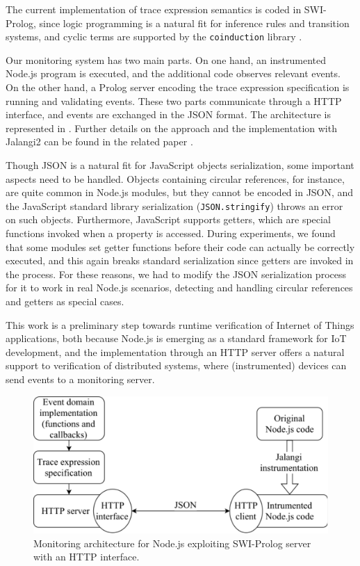 The current implementation of trace expression semantics is coded in SWI-Prolog, since logic programming is a natural fit for inference rules and transition systems, and cyclic terms are supported by the \texttt{coinduction} library \cite{CoLP06}.

Our monitoring system has two main parts.
On one hand, an instrumented Node.js program is executed, and the additional code observes relevant events.
On the other hand, a Prolog server encoding the trace expression specification is running and validating events.
These two parts communicate through a HTTP interface, and events are exchanged in the JSON format.
The architecture is represented in .
Further details on the approach and the implementation with Jalangi2 can be found in the related paper \cite{TowardsIoT17}.

Though JSON is a natural fit for JavaScript objects serialization, some important aspects need to be handled.
Objects containing circular references, for instance, are quite common in Node.js modules, but they cannot be encoded in JSON, and the JavaScript standard library serialization (\lstinline|JSON.stringify|) throws an error on such objects.
Furthermore, JavaScript supports getters, which are special functions invoked when a property is accessed.
During experiments, we found that some modules set getter functions before their code can actually be correctly executed, and this again breaks standard serialization since getters are invoked in the process.
For these reasons, we had to modify the JSON serialization process for it to work in real Node.js scenarios, detecting and handling circular references and getters as special cases.

This work is a preliminary step towards runtime verification of Internet of Things applications,
both because Node.js is emerging as a standard framework for IoT development, and the implementation through an HTTP
server offers a natural support to verification of distributed systems, where (instrumented) devices can send events to a monitoring server.

\begin{figure}
\centering\includegraphics[width=.7\textwidth]{fig/diagram}
\caption{Monitoring architecture for Node.js exploiting SWI-Prolog server with an HTTP interface.}
\label{fig:arch}
\end{figure}

